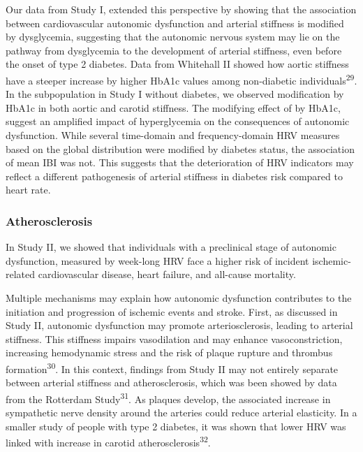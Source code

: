 \documentclass[
  a4paper,
  headsepline=true,
  open=any]{scrbook}
\begin{document}
Our data from Study I, extended this perspective by showing that the
association between cardiovascular autonomic dysfunction and arterial
stiffness is modified by dysglycemia, suggesting that the autonomic
nervous system may lie on the pathway from dysglycemia to the
development of arterial stiffness, even before the onset of type 2
diabetes. Data from Whitehall II showed how aortic stiffness have a
steeper increase by higher HbA1c values among non-diabetic
individuals\textsuperscript{29}. In the subpopulation in Study I without
diabetes, we observed modification by HbA1c in both aortic and carotid
stiffness. The modifying effect of by HbA1c, suggest an amplified impact
of hyperglycemia on the consequences of autonomic dysfunction. While
several time-domain and frequency-domain HRV measures based on the
global distribution were modified by diabetes status, the association of
mean IBI was not. This suggests that the deterioration of HRV indicators
may reflect a different pathogenesis of arterial stiffness in diabetes
risk compared to heart rate.

\hypertarget{atherosclerosis-1}{%
\subsubsection{Atherosclerosis}\label{atherosclerosis-1}}

In Study II, we showed that individuals with a preclinical stage of
autonomic dysfunction, measured by week-long HRV face a higher risk of
incident ischemic-related cardiovascular disease, heart failure, and
all-cause mortality.

Multiple mechanisms may explain how autonomic dysfunction contributes to
the initiation and progression of ischemic events and stroke. First, as
discussed in Study II, autonomic dysfunction may promote
arteriosclerosis, leading to arterial stiffness. This stiffness impairs
vasodilation and may enhance vasoconstriction, increasing hemodynamic
stress and the risk of plaque rupture and thrombus
formation\textsuperscript{30}. In this context, findings from Study II
may not entirely separate between arterial stiffness and
atherosclerosis, which was been showed by data from the Rotterdam
Study\textsuperscript{31}. As plaques develop, the associated increase
in sympathetic nerve density around the arteries could reduce arterial
elasticity. In a smaller study of people with type 2 diabetes, it was
shown that lower HRV was linked with increase in carotid
atherosclerosis\textsuperscript{32}.
\end{document}
